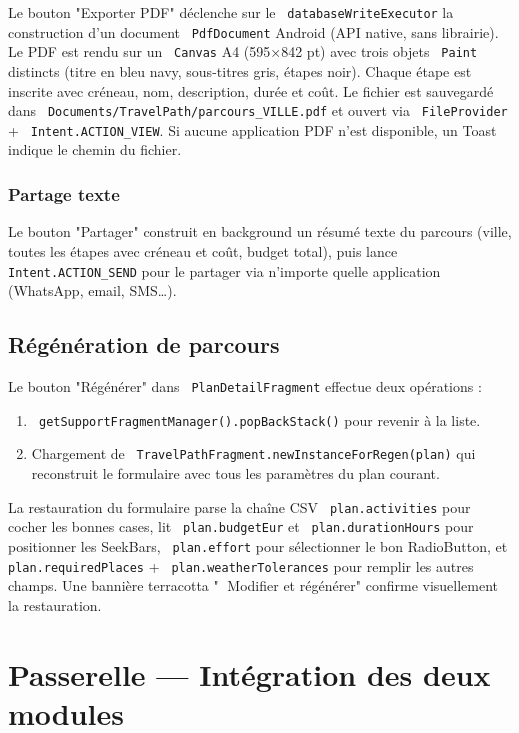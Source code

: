 \documentclass[a4paper,12pt,openany]{report}
\newcommand{\ic}[1]{\texttt{\small\colorbox{lightbg}{\color{navy!90} #1}}}
\begin{document}
Le bouton "Exporter PDF" déclenche sur le \ic{databaseWriteExecutor} la
construction d'un document \ic{PdfDocument} Android (API native, sans librairie).
Le PDF est rendu sur un \ic{Canvas} A4 (595×842 pt) avec trois objets \ic{Paint}
distincts (titre en bleu navy, sous-titres gris, étapes noir). Chaque étape
est inscrite avec créneau, nom, description, durée et coût. Le fichier est
sauvegardé dans \ic{Documents/TravelPath/parcours\_VILLE.pdf} et ouvert via
\ic{FileProvider} + \ic{Intent.ACTION\_VIEW}. Si aucune application PDF n'est
disponible, un Toast indique le chemin du fichier.

\subsection{Partage texte}

Le bouton "Partager" construit en background un résumé texte du parcours
(ville, toutes les étapes avec créneau et coût, budget total), puis lance
\ic{Intent.ACTION\_SEND} pour le partager via n'importe quelle application
(WhatsApp, email, SMS…).

\section{Régénération de parcours}

Le bouton "Régénérer" dans \ic{PlanDetailFragment} effectue deux opérations :
\begin{enumerate}
  \item \ic{getSupportFragmentManager().popBackStack()} pour revenir à la liste.
  \item Chargement de \ic{TravelPathFragment.newInstanceForRegen(plan)} qui
    reconstruit le formulaire avec tous les paramètres du plan courant.
\end{enumerate}

La restauration du formulaire parse la chaîne CSV \ic{plan.activities} pour
cocher les bonnes cases, lit \ic{plan.budgetEur} et \ic{plan.durationHours}
pour positionner les SeekBars, \ic{plan.effort} pour sélectionner le bon
RadioButton, et \ic{plan.requiredPlaces} + \ic{plan.weatherTolerances} pour
remplir les autres champs. Une bannière terracotta "🔄 Modifier et régénérer"
confirme visuellement la restauration.


\chapter{Passerelle — Intégration des deux modules}
\end{document}
